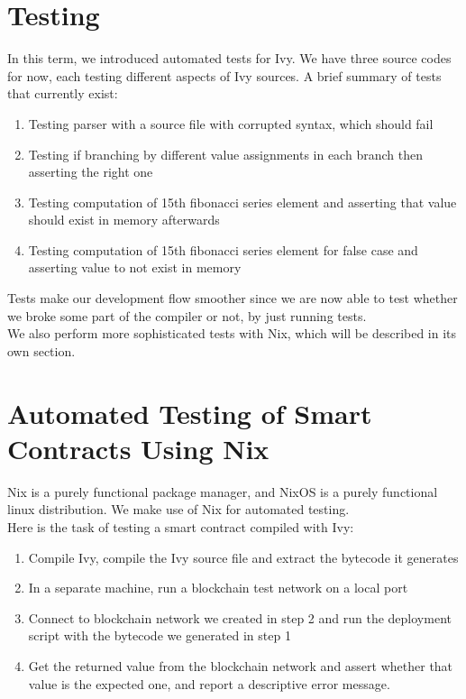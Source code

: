 \documentclass{article}
\begin{document}
\section{Testing}
In this term, we introduced automated tests for Ivy. We have three source codes for now, each testing different aspects of Ivy sources. A brief summary of tests that currently exist:
\begin{enumerate}
  \item Testing parser with a source file with corrupted syntax, which should fail
  \item Testing if branching by different value assignments in each branch then asserting the right one
  \item Testing computation of 15th fibonacci series element and asserting that value should exist in memory afterwards
  \item Testing computation of 15th fibonacci series element for false case and asserting value to not exist in memory
\end{enumerate}

Tests make our development flow smoother since we are now able to test whether we broke some part of the compiler or not, by just running tests. \\

We also perform more sophisticated tests with Nix, which will be described in its own section.

\section{Automated Testing of Smart Contracts Using Nix}
\label{sec:nix_tests}
Nix\cite{nix} is a purely functional package manager, and NixOS\cite{nixos} is a purely functional linux distribution. We make use of Nix for automated testing. \\

Here is the task of testing a smart contract compiled with Ivy:
\begin{enumerate}
  \item Compile Ivy, compile the Ivy source file and extract the bytecode it generates
  \item In a separate machine, run a blockchain test network on a local port
  \item Connect to blockchain network we created in step 2 and run the deployment script with the bytecode we generated in step 1
  \item Get the returned value from the blockchain network and assert whether that value is the expected one, and report a descriptive error message.
\end{enumerate}
\end{document}
